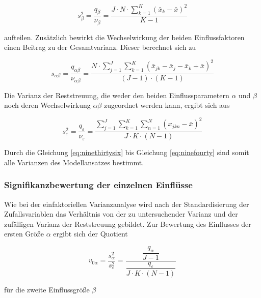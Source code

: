 \begin{equation}\label{eq:ninethirtyeight}
s_{\beta}^{2} =\dfrac{q_{\beta}}{\nu _{\beta}} =\dfrac{J\cdot N\cdot \sum _{k=1}^{K}\left(\bar{x}_{k} -\bar{x}\right)^{2}}{K-1}
\end{equation}

\noindent aufteilen. Zus\"{a}tzlich bewirkt die Wechselwirkung der beiden Einflussfaktoren einen Beitrag zu der Gesamtvarianz. Dieser berechnet sich zu

\begin{equation}\label{eq:ninethirtynine}
s_{\alpha \beta} =\dfrac{q_{\alpha \beta}}{\nu _{\alpha \beta}} =\dfrac{N\cdot \sum _{j=1}^{J}\sum _{k=1}^{K}\left(\bar{x}_{jk} -\bar{x}_{j} -\bar{x}_{k} +\bar{x}\right)^{2}   }{(J-1)\cdot (K-1)}
\end{equation}

\noindent Die Varianz der Reststreuung, die weder den beiden Einflussparametern $\alpha$ und $\beta$ noch deren Wechselwirkung $\alpha\beta$ zugeordnet werden kann, ergibt sich aus

\begin{equation}\label{eq:ninefourty}
s_{\varepsilon }^{2} =\dfrac{q_{\varepsilon}}{\nu _{\varepsilon}} =\dfrac{\sum _{j=1}^{J}\sum _{k=1}^{K}\sum _{n=1}^{N}\left(x_{jkn} -\bar{x}\right)^{2}}{J\cdot K\cdot (N-1)}
\end{equation}

\noindent Durch die Gleichung \eqref{eq:ninethirtysix} bis Gleichung \eqref{eq:ninefourty} sind somit alle Varianzen des Modellansatzes bestimmt.

\subsubsection{Signifikanzbewertung der einzelnen Einfl\"{u}sse}

\noindent Wie bei der einfaktoriellen Varianzanalyse wird nach der Standardisierung der Zufallsvariablen das Verh\"{a}ltnis von der zu untersuchender Varianz und der zuf\"{a}lligen Varianz der Reststreuung gebildet. Zur Bewertung des Einflusses der ersten Gr\"{o}{\ss}e $\alpha$ ergibt sich der Quotient

\begin{equation}\label{eq:ninefourtyone}
v_{0\alpha} =\dfrac{s_{\alpha}^{2}}{s_{\varepsilon}^{2}} =\dfrac{\dfrac{q_{\alpha }}{J-1} }{\dfrac{q_{\varepsilon}}{J\cdot K\cdot (N-1)}}
\end{equation}

\noindent f\"{u}r die zweite Einflussgr\"{o}{\ss}e $\beta$


